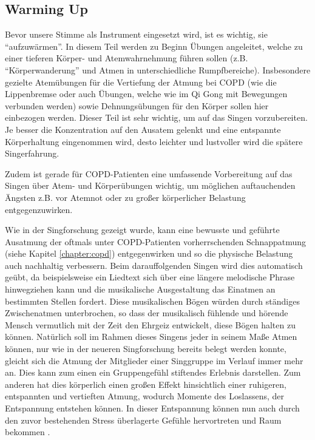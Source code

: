 \subsection*{Warming Up}
Bevor unsere Stimme als Instrument eingesetzt wird, ist es wichtig, sie "`aufzuwärmen"'. In diesem Teil werden zu Beginn Übungen angeleitet, welche zu einer tieferen Körper- und Atemwahrnehmung führen sollen (z.B. "`Körperwanderung"' und Atmen in unterschiedliche Rumpfbereiche). Insbesondere gezielte Atemübungen für die Vertiefung der Atmung bei COPD (wie die Lippenbremse oder auch Übungen, welche wie im Qi Gong mit Bewegungen verbunden werden) sowie Dehnungsübungen für den Körper sollen hier einbezogen werden. Dieser Teil ist sehr wichtig, um auf das Singen vorzubereiten. Je besser die Konzentration auf den Ausatem gelenkt und eine entspannte Körperhaltung eingenommen wird, desto leichter und lustvoller wird die spätere Singerfahrung. 

Zudem ist gerade für COPD-Patienten eine umfassende Vorbereitung auf das Singen über Atem- und Körperübungen wichtig, um möglichen auftauchenden Ängsten z.B. vor Atemnot oder zu großer körperlicher Belastung entgegenzuwirken. 

Wie in der Singforschung gezeigt wurde, kann eine bewusste und geführte Ausatmung der oftmals unter COPD-Patienten vorherrschenden Schnappatmung (siehe Kapitel \ref{chapter:copd}) entgegenwirken und so die physische Belastung auch nachhaltig verbessern. Beim darauffolgenden Singen wird dies automatisch geübt, da beispielsweise ein Liedtext sich über eine längere melodische Phrase hinwegziehen kann und die musikalische Ausgestaltung das Einatmen an bestimmten Stellen fordert. Diese musikalischen Bögen würden durch ständiges Zwischenatmen unterbrochen, so dass der musikalisch fühlende und hörende Mensch vermutlich mit der Zeit den Ehrgeiz entwickelt, diese Bögen halten zu können. Natürlich soll im Rahmen dieses Singens jeder in seinem Maße Atmen können, nur wie in der neueren Singforschung bereits belegt werden konnte, gleicht sich die Atmung der Mitglieder einer Singgruppe im Verlauf immer mehr an. Dies kann zum einen ein  Gruppengefühl stiftendes Erlebnis darstellen. Zum anderen hat dies körperlich einen großen Effekt hinsichtlich einer ruhigeren, entspannten und vertieften Atmung, wodurch Momente des Loslassens, der Entspannung entstehen können. In dieser Entspannung können nun auch durch den zuvor bestehenden Stress überlagerte Gefühle hervortreten und Raum bekommen \autocite[vgl.][59]{ehrmann2004}. 

